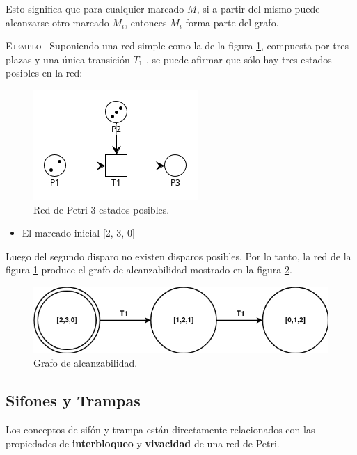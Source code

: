 \noindent Esto significa que para cualquier marcado $M$, si a partir del mismo puede alcanzarse otro marcado $M_i$, entonces $M_i$ forma parte del grafo. \\ \par

\noindent \textsc{Ejemplo} \ Suponiendo una red simple como la de la figura \ref{fig:rdp2.4_estadosposibles}, compuesta por tres plazas y una única transición $T_1$ , se puede afirmar que sólo hay tres estados posibles en la red:

\begin{figure}[H]
	\centering
	\includegraphics[scale=1.00]{Figures/marco teorico/imag4.png}
	\caption{Red de Petri 3 estados posibles.}
	\label{fig:rdp2.4_estadosposibles}
  \end{figure}
  
\begin{itemize}
    \item El marcado inicial [2, 3, 0]
\end{itemize}

Luego del segundo disparo no existen disparos posibles. Por lo tanto, la red de la figura \ref{fig:rdp2.4_estadosposibles} produce el grafo de alcanzabilidad  mostrado en la figura \ref{fig:rdp2.5_grafo}. \\

\begin{figure}[H]
	\centering
	\includegraphics[scale=0.5]{Figures/marco teorico/grafoalcanzabilidad.png}
	\caption{Grafo de alcanzabilidad.}
	\label{fig:rdp2.5_grafo}
  \end{figure}

\subsection{Sifones y Trampas} \label{sec:tysalg2}
Los conceptos de sifón y trampa están directamente relacionados con las propiedades de \textbf{interbloqueo} y \textbf{vivacidad} de una red de Petri.

